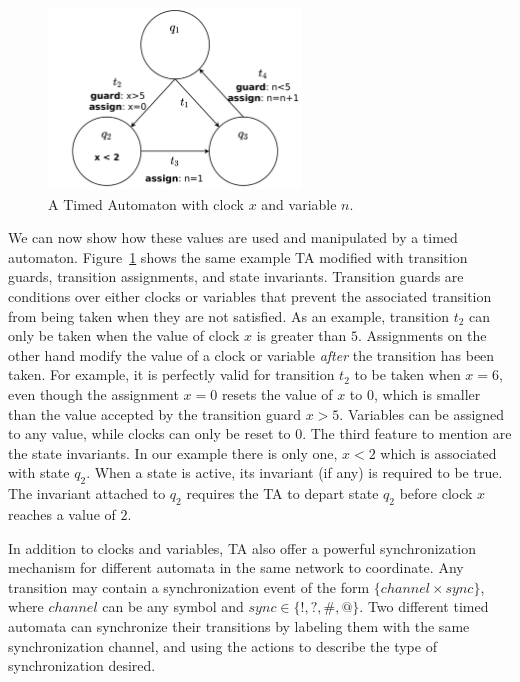 \documentclass[a4paper,11pt]{report}
\theoremstyle{definition}
\begin{document}
\begin{figure}[h]
  \centering
  \includegraphics[width=0.6\textwidth]{minTA-big}
  \caption{A Timed Automaton with clock $x$ and variable $n$.}
  \label{fig:example-big}
\end{figure}

We can now show how these values are used and manipulated by a timed automaton.
Figure~\ref{fig:example-big} shows the same example TA modified with transition
guards, transition assignments, and state invariants. Transition guards are
conditions over either clocks or variables that prevent the associated
transition from being taken when they are not satisfied. As an example,
transition $t_{2}$ can only be taken when the value of clock $x$ is greater than
$5$. Assignments on the other hand modify the value of a clock or variable
\emph{after} the transition has been taken. For example, it is perfectly valid
for transition $t_{2}$ to be taken when $x=6$, even though the assignment $x=0$
resets the value of $x$ to $0$, which is smaller than the value accepted by the
transition guard $x>5$. Variables can be assigned to any value, while clocks can
only be reset to $0$. The third feature to mention are the state invariants. In
our example there is only one, $x<2$ which is associated with state $q_{2}$.
When a state is active, its invariant (if any) is required to be true. The
invariant attached to $q_{2}$ requires the TA to depart state $q_{2}$ before
clock $x$ reaches a value of $2$.


In addition to clocks and variables, TA also offer a powerful synchronization
mechanism for different automata in the same network to coordinate. Any
transition may contain a synchronization event of the form
$\{channel \times sync\}$, where $channel$ can be any symbol and
$sync \in \{!,?,\#,@\}$. Two different timed automata can synchronize their
transitions by labeling them with the same synchronization channel, and using
the actions to describe the type of synchronization desired.
\end{document}
